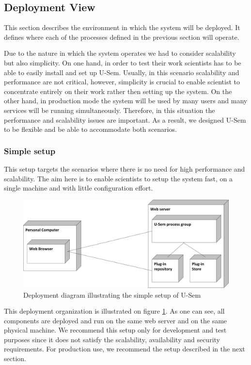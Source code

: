 \subsection{Deployment View}

This section describes the environment in which the system will be deployed. It defines where each of the processes defined in the previous section will operate. 

Due to the nature in which the system operates we had to consider scalability but also simplicity. On one hand, in order to test their work scientists has to be able to easily install and set up U-Sem. Usually, in this scenario scalability and performance are not critical, however, simplicity is crucial to enable scientist to concentrate entirely on their work rather then setting up the system. On the other hand, in production mode the system will be used by many users and many services will be running simultaneously. Therefore, in this situation the performance and scalability issues are important. As a result, we designed U-Sem to be flexible and be able to accommodate both scenarios.


\subsubsection{Simple setup}

This setup targets the scenarios where there is no need for high performance and scalability. The aim here is to enable scientists to setup the system fast, on a single machine and with little configuration effort. 

\begin{figure}[h!]
  \centering
  	\includegraphics[scale=0.70]{plug-in/layers/simple_setup.png}
  \caption{Deployment diagram illustrating the simple setup of U-Sem}
  \label{fig:simple_set}
\end{figure}

This deployment organization is illustrated on figure \ref{fig:simple_set}. As one can see, all components are deployed and run on the same web server and on the same physical machine. We recommend this setup only for development and test purposes since it does not satisfy the scalability, availability and security requirements. For production use, we recommend the setup described in the next section.

